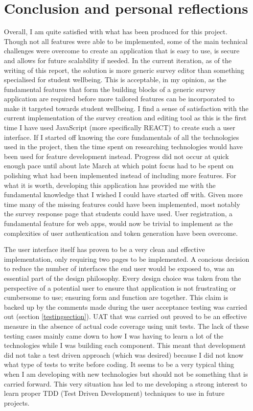 \section{Conclusion and personal reflections}

Overall, I am quite satisfied with what has been produced for this project.
Though not all features were able to be implemented, some of the main technical challenges were overcome to create an application that is easy 
to use, is secure and allows for future scalability if needed.
In the current iteration, as of the writing of this report, the solution is more generic survey editor than something specialised for student wellbeing.
This is acceptable, in my opinion, as the fundamental features that form the building blocks of a generic survey application are required 
before more tailored features can be incorporated to make it targeted towards student wellbeing.
I find a sense of satisfaction with the current implementation of the survey creation and editing tool as this is the first time I have used JavaScript
(more specifically REACT) to create such a user interface.  
If I started off knowing the core fundamentals of all the technologies used in the project, then the time spent on researching technologies would have
been used for feature development instead.
Progress did not occur at quick enough pace until about late March at which point focus had to be spent on polishing what had been implemented instead 
of including more features. 
For what it is worth, developing this application has provided me with the fundamental knowledge that I wished I could have started off with.
Given more time many of the missing features could have been implemented, most notably the survey response page that students could have used.
User registration, a fundamental feature for web apps, would now be trivial to implement as the complexities of user authentication and token 
generation have been overcome.

The user interface itself has proven to be a very clean and effective implementation, only requiring two pages to be implemented.
A concious decision to reduce the number of interfaces the end user would be exposed to, was an essential part of the design philosophy.
Every design choice was taken from the perspective of a potential user to ensure that application is not frustrating or cumbersome to use; ensuring 
form and function are together.
This claim is backed up by the comments made during the user acceptance testing was carried out (section \ref{testingsection}).
UAT that was carried out proved to be an effective measure in the absence of actual code coverage using unit tests.
The lack of these testing cases mainly came down to how I was having to learn a lot of the technologies while I was building each component.
This meant that development did not take a test driven approach (which was desired) because I did not know what type of tests to write before coding.
It seems to be a very typical thing when I am developing with new technologies but should not be something that is carried forward.
This very situation has led to me developing a strong interest to learn proper TDD (Test Driven Development) techniques to use in future projects. 

